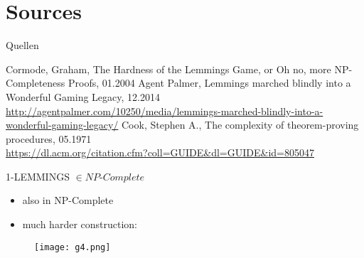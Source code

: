 \documentclass[]{beamer}
\begin{document}
\section{Sources}
\begin{frame}{Quellen}
\begin{thebibliography}{9}
Cormode, Graham, The Hardness of the Lemmings Game, or
Oh no, more NP-Completeness Proofs, 01.2004
Agent Palmer, Lemmings marched blindly into a Wonderful Gaming Legacy, 12.2014\\
\url{http://agentpalmer.com/10250/media/lemmings-marched-blindly-into-a-wonderful-gaming-legacy/}
Cook, Stephen A., The complexity of theorem-proving procedures, 05.1971\\
\url{https://dl.acm.org/citation.cfm?coll=GUIDE&dl=GUIDE&id=805047}
\end{thebibliography}
\end{frame}

\frame{\titlepage}
\frame{\titlepage}

\appendix


\begin{frame}{1-LEMMINGS $\in NP \text{-} Complete$}
\begin{itemize}
\item also in NP-Complete
\item much harder construction:
\end{itemize}
\begin{figure}
\texttt{[image: g4.png]}
\end{figure}
\end{frame}
\end{document}
